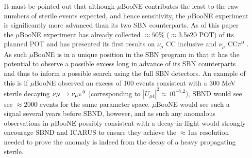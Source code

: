 \documentclass[11pt, a4paper]{article}
\def\ster{\ensuremath N}
\begin{document}
It must be pointed out that although $\mu$BooNE contributes the least to the raw numbers of sterile events expected, and hence sensitivity, the $\mu$BooNE experiment is significantly more advanced than its two SBN counterparts. As of this paper the $\mu$BooNE experiment has already collected $\approx 50$\% ($\approx$3.5e20 POT) of its planned POT and has presented its first results on $\nu_\mu$ CC inclusive and $\nu_\mu$ CC$\pi^0$ \cite{mubooneneutrino}. As such $\mu$BooNE is in a unique position in the SBN program in that it has the potential to observe  a possible excess long in advance of its SBN counterparts and thus to inform a possible search using the full SBN detectors. An example of this is if $\mu$BooNE observed an excess of 100 events consistent with a 300 MeV sterile decaying $\nu_\ster \rightarrow \nu_\mu \pi^0$ (corresponding to $|U_{\mu 4}|^2 \approx 10^{-7.2}$), SBND would see see $\approx 2000$ events for the same parameter space. $\mu$BooNE would see such a signal several years before SBND, however, and as such any anomalous observations in $\mu$BooNE possibly consistent with a decay-in-flight would strongly encourage SBND and ICARUS to ensure they achieve the $\approx$1ns resolution needed to prove the anomaly is indeed from the decay of a heavy propagating sterile.
\end{document}
